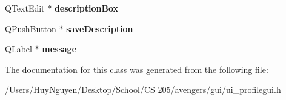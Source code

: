 \begin{DoxyCompactItemize}
\item 
Q\+Text\+Edit $\ast$ {\bfseries description\+Box}\hypertarget{classUi__ProfileGUI_a27cae2ceb8d97b4269f05ab263b238ff}{}\label{classUi__ProfileGUI_a27cae2ceb8d97b4269f05ab263b238ff}

\item 
Q\+Push\+Button $\ast$ {\bfseries save\+Description}\hypertarget{classUi__ProfileGUI_a76c3431410b5b18d8c823a4a5f087442}{}\label{classUi__ProfileGUI_a76c3431410b5b18d8c823a4a5f087442}

\item 
Q\+Label $\ast$ {\bfseries message}\hypertarget{classUi__ProfileGUI_a200676a8b7c4e109fdaab4a6b3086935}{}\label{classUi__ProfileGUI_a200676a8b7c4e109fdaab4a6b3086935}

\end{DoxyCompactItemize}


The documentation for this class was generated from the following file\+:\begin{DoxyCompactItemize}
\item 
/\+Users/\+Huy\+Nguyen/\+Desktop/\+School/\+C\+S 205/avengers/gui/ui\+\_\+profilegui.\+h\end{DoxyCompactItemize}
